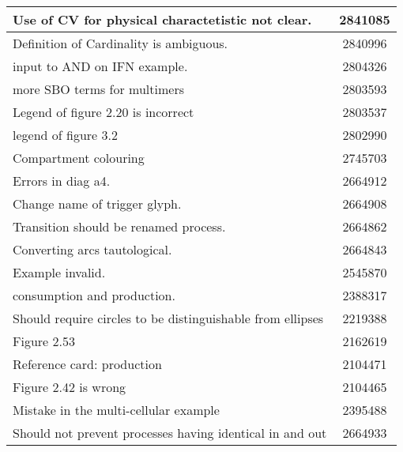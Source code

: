 \begin{center}
\begin{supertabular}{|p{12cm}|c|}
Use of CV for physical charactetistic not clear. & 2841085 \\\hline
Definition of Cardinality is ambiguous. & 2840996 \\\hline
input to AND on IFN example. & 2804326 \\\hline
more SBO terms for multimers & 2803593 \\\hline
Legend of figure 2.20 is incorrect & 2803537 \\\hline
legend of figure 3.2 & 2802990 \\\hline
Compartment colouring & 2745703 \\\hline
Errors in diag a4. & 2664912 \\\hline
Change name of trigger glyph. & 2664908 \\\hline
Transition should be renamed process. & 2664862 \\\hline
Converting arcs tautological. & 2664843 \\\hline
Example invalid. & 2545870 \\\hline
consumption and production. & 2388317 \\\hline
Should require circles to be distinguishable from ellipses & 2219388
\\\hline
Figure 2.53 & 2162619 \\\hline
Reference card: production & 2104471 \\\hline
Figure 2.42 is wrong & 2104465 \\\hline
Mistake in the multi-cellular example  & 2395488 \\\hline
Should not prevent processes having identical in and out & 2664933 \\\hline
\end{supertabular}
\end{center}
